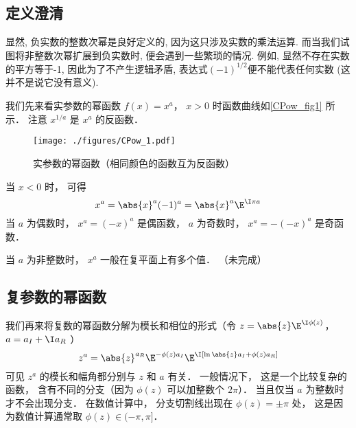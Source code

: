 

\subsection{定义澄清}
显然, 负实数的整数次幂是良好定义的, 因为这只涉及实数的乘法运算. 而当我们试图将非整数次幂扩展到负实数时, 便会遇到一些繁琐的情况. 例如, 显然不存在实数的平方等于-1, 因此为了不产生逻辑矛盾, 表达式$(-1)^{1/2}$便不能代表任何实数 (这并不是说它没有意义). 

我们先来看实参数的幂函数 $f(x) = x^a$， $x > 0$ 时函数曲线如\autoref{CPow_fig1} 所示． 注意 $x^{1/a}$ 是 $x^a$ 的反函数．
\begin{figure}[ht]
\centering
\texttt{[image: ./figures/CPow\_1.pdf]}
\caption{实参数的幂函数（相同颜色的函数互为反函数）} \label{CPow_fig1}
\end{figure}

当 $x < 0$ 时， 可得
\begin{equation}
x^a = \abs{x}^a (-1)^a = \abs{x}^a\E^{\I\pi a}
\end{equation}
当 $a$ 为偶数时， $x^a = (-x)^a$ 是偶函数， $a$ 为奇数时， $x^a = -(-x)^a$ 是奇函数． 

当 $a$ 为非整数时， $x^a$ 一般在复平面上有多个值． （未完成）

\subsection{复参数的幂函数}
我们再来将复数的幂函数分解为模长和相位的形式（令 $z = \abs{z} \E^{\I\phi(z)}$， $a = a_I + \I a_R$ ）
\begin{equation}
z^a = \abs{z}^{a_R} \E^{-\phi(z) a_I} \E^{\I[\ln\abs{z}a_I + \phi(z)a_R]}
\end{equation}
可见 $z^a$ 的模长和幅角都分别与 $z$ 和 $a$ 有关． 一般情况下， 这是一个比较复杂的函数， 含有不同的分支（因为 $\phi(z)$ 可以加整数个 $2\pi$）．%
当且仅当 $a$ 为整数时才不会出现分支． 在数值计算中， 分支切割线出现在 $\phi(z) = \pm\pi$ 处， 这是因为数值计算通常取 $\phi(z)\in(-\pi, \pi]$．
